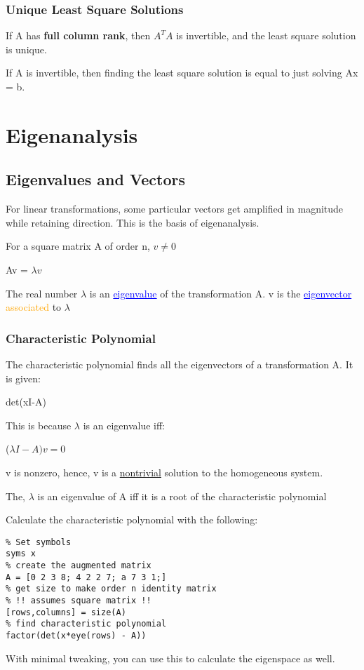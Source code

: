 \documentclass{article}
\newcommand{\bul}[1]{\textcolor{blue}{\underline{#1}}}
\newcommand{\sbreak}{\vspace{10pt}}
\begin{document}
\subsubsection{Unique Least Square Solutions}
If A has \textbf{full column rank}, then $A^TA$ is invertible, and the least square solution is unique.

If A is invertible, then finding the least square solution is equal to just solving Ax = b.

\section{Eigenanalysis}
\subsection{Eigenvalues and Vectors}
For linear transformations, some particular vectors get amplified in magnitude while retaining direction. This is the basis of eigenanalysis.

\sbreak
For a square matrix A of order n, $v\neq 0$
\begin{center}
    Av = $\lambda v$
\end{center}
The real number $\lambda$ is an \bul{eigenvalue} of the transformation A. v is the \bul{eigenvector} \textcolor{orange}{associated} to $\lambda$

\subsubsection{Characteristic Polynomial}
The characteristic polynomial finds all the eigenvectors of a transformation A. It is given:

\begin{center}
    det(xI-A)
\end{center}

This is because $\lambda$ is an eigenvalue iff:
\begin{center}
    ($\lambda I - A)v = 0$
\end{center}
v is nonzero, hence, v is a \underline{nontrivial} solution to the homogeneous system.

\sbreak

The, $\lambda$ is an eigenvalue of A iff it is a root of the characteristic polynomial

\begin{tcolorbox}[title=MATLAB tip, colback=blue!5, colframe=blue!80!black]
    Calculate the characteristic polynomial with the following:
    \begin{lstlisting}
% Set symbols
syms x
% create the augmented matrix 
A = [0 2 3 8; 4 2 2 7; a 7 3 1;]
% get size to make order n identity matrix
% !! assumes square matrix !!
[rows,columns] = size(A)
% find characteristic polynomial
factor(det(x*eye(rows) - A))
    \end{lstlisting}
    With minimal tweaking, you can use this to calculate the eigenspace as well.
\end{tcolorbox}
\end{document}
